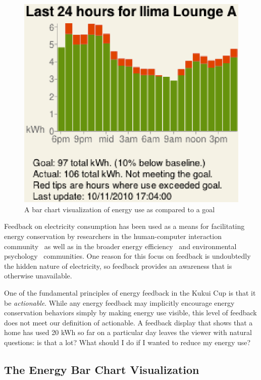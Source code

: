 \documentclass[10pt, conference, compsocconf]{IEEEtran-old}
\begin{document}
\begin{figure}[!tb]
	\centering
	\includegraphics[width=0.9\columnwidth]{energy-24hours-new.eps}
	\caption{A bar chart visualization of energy use as compared to a goal}
	\label{fig:energy-24hours}
\end{figure}

Feedback on electricity consumption has been used as a means for facilitating energy conservation by researchers in the human-computer interaction community~\cite{Froehlich2010} as well as in the broader energy efficiency~\cite{darby-review-2006, Faruqui09, Foster-2012} and environmental psychology~\cite{Becker78, Houwelingen89} communities. One reason for this focus on feedback is undoubtedly the hidden nature of electricity, so feedback provides an awareness that is otherwise unavailable.

One of the fundamental principles of energy feedback in the Kukui Cup is that it be \emph{actionable}. While any energy feedback may implicitly encourage energy conservation behaviors simply by making energy use visible, this level of feedback does not meet our definition of actionable. A feedback display that shows that a home has used 20 kWh so far on a particular day leaves the viewer with natural questions: is that a lot? What should I do if I wanted to reduce my energy use?


\subsection{The Energy Bar Chart Visualization}
\end{document}
